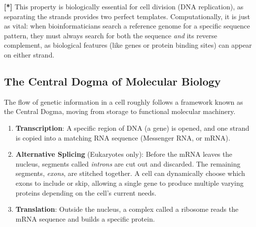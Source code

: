 \documentclass[11pt, a4paper]{article}
\newcommand{\sta}{\textbf{[*] }}
\begin{document}
\sta This property is biologically essential for cell division (DNA replication), as separating the strands provides two perfect templates. Computationally, it is just as vital: when bioinformaticians search a reference genome for a specific sequence pattern, they must always search for both the sequence \textit{and} its reverse complement, as biological features (like genes or protein binding sites) can appear on either strand.

\subsection{The Central Dogma of Molecular Biology}

The flow of genetic information in a cell roughly follows a framework known as the Central Dogma, moving from storage to functional molecular machinery.

\begin{center}
\end{center}

\begin{enumerate}
    \item \textbf{Transcription}: A specific region of DNA (a gene) is opened, and one strand is copied into a matching RNA sequence (Messenger RNA, or mRNA).
    \item \textbf{Alternative Splicing} (Eukaryotes only): Before the mRNA leaves the nucleus, segments called \textit{introns} are cut out and discarded. The remaining segments, \textit{exons}, are stitched together. A cell can dynamically choose which exons to include or skip, allowing a single gene to produce multiple varying proteins depending on the cell's current needs.
    \item \textbf{Translation}: Outside the nucleus, a complex called a ribosome reads the mRNA sequence and builds a specific protein. 
\end{enumerate}
\end{document}
